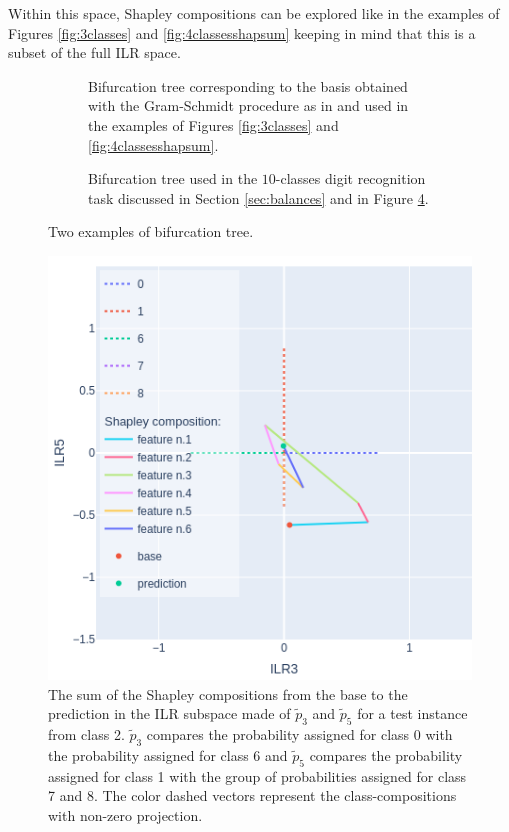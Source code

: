 \documentclass{article}
\theoremstyle{plain}
\theoremstyle{definition}
\theoremstyle{remark}
\begin{document}
Within this space, Shapley compositions can be explored like in the examples of Figures \ref{fig:3classes} and \ref{fig:4classesshapsum} keeping in mind that this is a subset of the full ILR space. 
\begin{figure}
  \begin{subfigure}{0.5\textwidth}
    \centering
    
    \caption{Bifurcation tree corresponding to the basis obtained with the Gram-Schmidt procedure as in \cite{egozcue2003isometric} and used in the examples of Figures \ref{fig:3classes} and \ref{fig:4classesshapsum}.}
    \label{fig:bifurc1}
  \end{subfigure}

  \vspace{0.5cm}
  \begin{subfigure}{0.5\textwidth}
      \centering
      
      \caption{Bifurcation tree used in the $10$-classes digit recognition task discussed in Section \ref{sec:balances} and in Figure \ref{fig:moreclasses35}.}
      \label{fig:bifurc2}
    \end{subfigure}
  \caption{Two examples of bifurcation tree.}
  \label{fig:trees}
\end{figure}
\begin{figure}
  \centering
  \includegraphics[width=0.8\linewidth]{figures/moreclasses/ilrplot35.png}
  \caption{The sum of the Shapley compositions from the base to the prediction in the ILR subspace made of $\tilde{p}_3$ and $\tilde{p}_5$ for a test instance from class 2. $\tilde{p}_3$ compares the probability assigned for class 0 with the probability assigned for class 6 and $\tilde{p}_5$ compares the probability assigned for class 1 with the group of probabilities assigned for class 7 and 8. The color dashed vectors represent the class-compositions with non-zero projection.}
  \label{fig:moreclasses35}
\end{figure}
\end{document}
